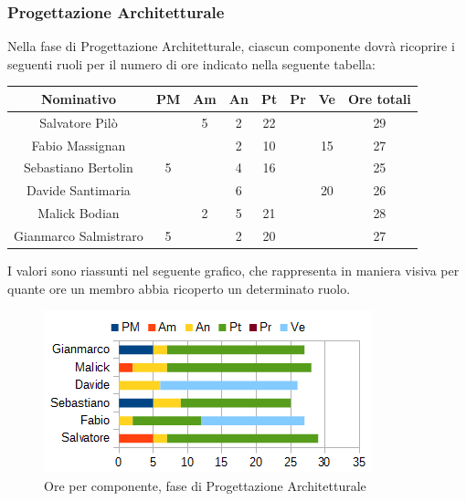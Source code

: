 		\subsubsection{Progettazione Architetturale}
		Nella fase di Progettazione Architetturale, ciascun componente dovrà ricoprire i seguenti ruoli per il numero di ore indicato nella seguente tabella: \\
		\begin{table}[H]
		\centering
		\begin{tabular}{|c|c|c|c|c|c|c|c|}
			\hline
			\textbf{Nominativo}		& \textbf{PM}	& \textbf{Am}	& \textbf{An}	& \textbf{Pt}	& \textbf{Pr}	& \textbf{Ve}	& \textbf{Ore totali}     \\
			\hline
			Salvatore Pilò			& 		& 5 	& 2		& 22	&		&		& 29 \\
			Fabio Massignan			&		& 		& 2		& 10	&		& 15	& 27 \\
			Sebastiano Bertolin		& 5		& 		& 4		& 16	&		&		& 25 \\
			Davide Santimaria		&		& 		& 6		&		&		& 20	& 26 \\
			Malick Bodian			& 		& 2		& 5		& 21	&		& 		& 28 \\
			Gianmarco Salmistraro	& 5		& 		& 2		& 20	&		& 		& 27 \\
			\hline
		\end{tabular}
		\end{table}
		I valori sono riassunti nel seguente grafico, che rappresenta in maniera visiva per quante ore un membro abbia ricoperto un determinato ruolo. \\
		\begin{figure}[H]
			\centering
			\includegraphics[width=1\linewidth]{immagini/grafici/progettazione_architetturale-barra.png}
			\caption{Ore per componente, fase di Progettazione Architetturale}
		\end{figure}
